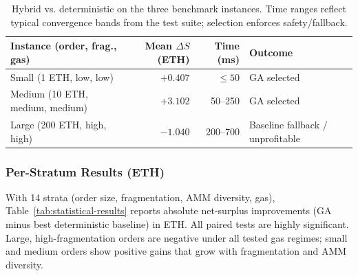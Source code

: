 \documentclass[11pt]{article}
\newcommand{\1}{\mathbf{1}}  %
\begin{document}
\begin{table}[t]
\centering
\small
\begin{tabular}{lrrl}
\toprule
Instance (order, frag., gas) & Mean $\Delta S$ (ETH) & Time (ms) & Outcome \\ \midrule
Small (1 ETH, low, low) & $+0.407$ & $\le 50$ & GA selected \\
Medium (10 ETH, medium, medium) & $+3.102$ & 50--250 & GA selected \\
Large (200 ETH, high, high) & $-1.040$ & 200--700 & Baseline fallback / unprofitable \\
\bottomrule
\end{tabular}
\caption{Hybrid vs. deterministic on the three benchmark instances. Time ranges reflect typical convergence bands from the test suite; selection enforces safety/fallback.}
\label{tab:compare-summary}
\end{table}


\subsubsection{Per-Stratum Results (ETH)}
With 14 strata (order size, fragmentation, AMM diversity, gas), Table~\ref{tab:statistical-results} reports absolute net-surplus improvements (GA minus best deterministic baseline) in ETH. All paired tests are highly significant. Large, high-fragmentation orders are negative under all tested gas regimes; small and medium orders show positive gains that grow with fragmentation and AMM diversity.
\end{document}
